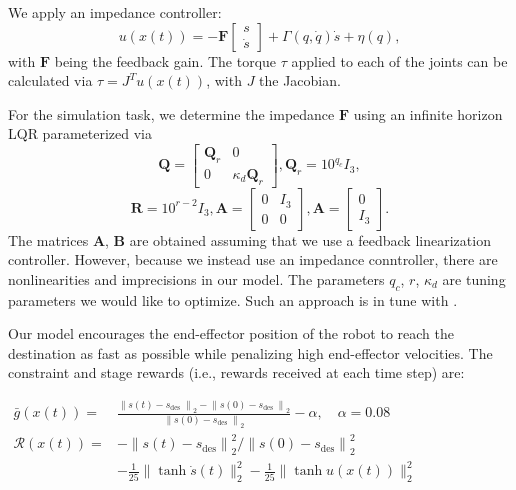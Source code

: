 We apply an impedance controller:
\begin{equation}
	u(x(t)) = -\boldsymbol{F}\begin{bmatrix}
		s\\
		\dot{s}
	\end{bmatrix} + \Gamma(q,\dot{q})\dot{s} + \eta(q),
\end{equation}
with $\boldsymbol{F}$ being the feedback gain. The torque $\tau$ applied to each of the joints can be calculated via $\tau = J^Tu(x(t))$, with $J$ the Jacobian.

For the simulation task, we determine the impedance $\boldsymbol{F}$ using an infinite horizon LQR parameterized via
\begin{equation*}
	\boldsymbol{Q} = \begin{bmatrix}
		\boldsymbol{Q}_r & 0\\
		0 & \kappa_d\boldsymbol{Q}_r
	\end{bmatrix}, \boldsymbol{Q}_r=10^{q_c}I_3,
\end{equation*}
\begin{equation*}
	 \boldsymbol{R}=10^{r-2}I_3,  \boldsymbol{A} = \begin{bmatrix}
	 	0 & I_3\\
	 	0 & 0
	 \end{bmatrix}, \boldsymbol{A}=\begin{bmatrix} 0\\I_3
	\end{bmatrix}.
\end{equation*}
The matrices $\boldsymbol{A}$, $\boldsymbol{B}$ are obtained assuming that we use a feedback linearization controller. However, because we instead use an impedance conntroller, there are nonlinearities and imprecisions in our model. The parameters $q_c$, $r$, $\kappa_d$ are tuning parameters we would like to optimize. Such an approach is in tune with \cite{LQR}.

Our model encourages the end-effector position of the robot to reach the destination as fast as possible while penalizing high end-effector velocities.
The constraint and stage rewards (i.e., rewards received at each time step) are:

\begin{center}
	$\begin{aligned}
	\bar{g}(x(t))=& \frac{\left\|s(t)-s_{\text {des }}\right\|_{2}-\left\|s(0)-s_{\text {des }}\right\|_{2}}{\left\|s(0)-s_{\text {des }}\right\|_{2}}-\alpha, \quad \alpha=0.08 \\
	\mathcal{R}(x(t))=&-\left\|s(t)-s_{\mathrm{des}}\right\|_{2}^{2} /\left\|s(0)-s_{\operatorname{des}}\right\|_{2}^{2} \\
	&-\frac{1}{25}\|\tanh \dot{s}(t)\|_{2}^{2}-\frac{1}{25}\|\tanh u(x(t))\|_{2}^{2}
	\end{aligned}$
\end{center}
 

